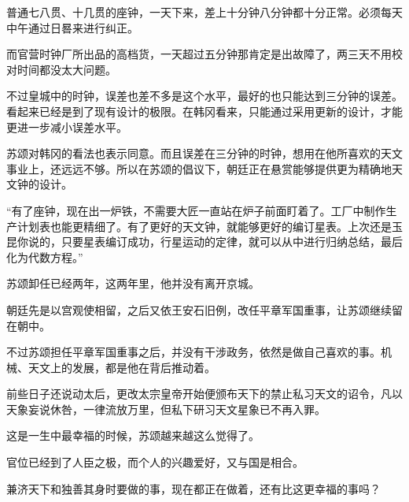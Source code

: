 普通七八贯、十几贯的座钟，一天下来，差上十分钟八分钟都十分正常。必须每天中午通过日晷来进行纠正。

而官营时钟厂所出品的高档货，一天超过五分钟那肯定是出故障了，两三天不用校对时间都没太大问题。

不过皇城中的时钟，误差也差不多是这个水平，最好的也只能达到三分钟的误差。看起来已经是到了现有设计的极限。在韩冈看来，只能通过采用更新的设计，才能更进一步减小误差水平。

苏颂对韩冈的看法也表示同意。而且误差在三分钟的时钟，想用在他所喜欢的天文事业上，还远远不够。所以在苏颂的倡议下，朝廷正在悬赏能够提供更为精确地天文钟的设计。

“有了座钟，现在出一炉铁，不需要大匠一直站在炉子前面盯着了。工厂中制作生产计划表也能更精细了。有了更好的天文钟，就能够更好的编订星表。上次还是玉昆你说的，只要星表编订成功，行星运动的定律，就可以从中进行归纳总结，最后化为代数方程。”

苏颂卸任已经两年，这两年里，他并没有离开京城。

朝廷先是以宫观使相留，之后又依王安石旧例，改任平章军国重事，让苏颂继续留在朝中。

不过苏颂担任平章军国重事之后，并没有干涉政务，依然是做自己喜欢的事。机械、天文上的发展，都是他在背后推动着。

前些日子还说动太后，更改太宗皇帝开始便颁布天下的禁止私习天文的诏令，凡以天象妄说休咎，一律流放万里，但私下研习天文星象已不再入罪。

这是一生中最幸福的时候，苏颂越来越这么觉得了。

官位已经到了人臣之极，而个人的兴趣爱好，又与国是相合。

兼济天下和独善其身时要做的事，现在都正在做着，还有比这更幸福的事吗？
